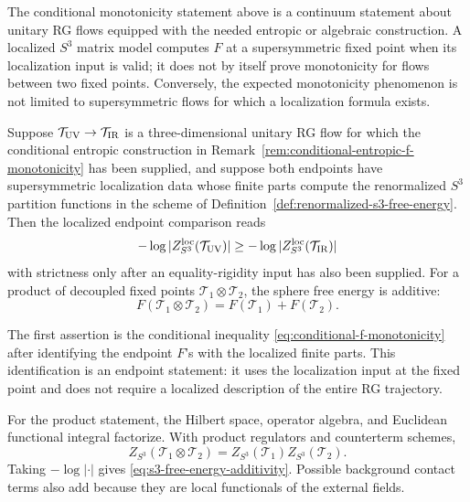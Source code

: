 \begin{remark}
\label{rem:f-theorem-not-matrix-model-identity}
The conditional monotonicity statement above is a continuum statement about
unitary RG flows equipped with the needed entropic or algebraic construction.
A localized \(S^3\) matrix model computes \(F\) at a supersymmetric fixed
point when its localization input is valid; it does not by itself prove
monotonicity for flows between two fixed points.  Conversely, the expected
monotonicity phenomenon is not limited to supersymmetric flows for which a
localization formula exists.
\end{remark}

\begin{remark}
\label{rem:f-theorem-susy-comparison}
Suppose \(\mathcal T_{\rm UV}\to\mathcal T_{\rm IR}\) is a three-dimensional
unitary RG flow for which the conditional entropic construction in
Remark~\ref{rem:conditional-entropic-f-monotonicity} has been supplied, and
suppose both endpoints have supersymmetric localization data whose finite
parts compute the renormalized \(S^3\) partition functions in the scheme of
Definition~\ref{def:renormalized-s3-free-energy}.  Then the localized
endpoint comparison reads
\[
  -\log|Z_{S^3}^{\rm loc}(\mathcal T_{\rm UV})|
  \ge
  -\log|Z_{S^3}^{\rm loc}(\mathcal T_{\rm IR})|
\]
with strictness only after an equality-rigidity input has also been supplied.
For a product of decoupled fixed points
\(\mathcal T_1\otimes\mathcal T_2\), the sphere free energy is additive:
\begin{equation}
  F(\mathcal T_1\otimes\mathcal T_2)=F(\mathcal T_1)+F(\mathcal T_2).
  \label{eq:s3-free-energy-additivity}
\end{equation}

The first assertion is the conditional inequality
\eqref{eq:conditional-f-monotonicity} after identifying the endpoint \(F\)'s
with the localized finite parts.  This identification is an endpoint
statement: it uses the localization input at the fixed point and does not
require a localized description of the entire RG trajectory.

For the product statement, the Hilbert space, operator algebra, and
Euclidean functional integral factorize.  With product regulators and
counterterm schemes,
\[
  Z_{S^3}(\mathcal T_1\otimes\mathcal T_2)
  =
  Z_{S^3}(\mathcal T_1)Z_{S^3}(\mathcal T_2).
\]
Taking \(-\log|\cdot|\) gives
\eqref{eq:s3-free-energy-additivity}.  Possible background contact terms
also add because they are local functionals of the external fields.
\end{remark}

